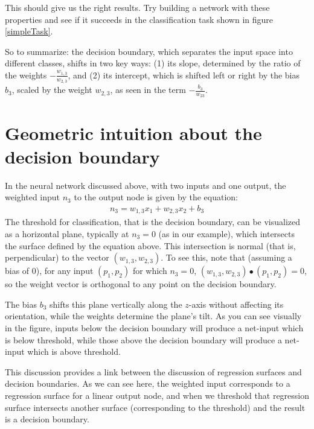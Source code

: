 This should give us the right results. Try building a network with these properties and see if it succeeds in the classification task  shown in figure \ref{simpleTask}.

So to summarize: the decision boundary, which separates the input space into different classes, shifts in two key ways: (1) its slope, determined by the ratio of the weights $-\frac{w_{1,3}}{w_{2,3}}$, and (2) its intercept, which is shifted left or right by the bias $b_3$, scaled by the weight $w_{2,3}$, as seen in the term $-\frac{b_3}{w_{23}}$.

\section{Geometric intuition about the decision boundary}

In the neural network discussed above, with two inputs and one output, the weighted input $n_3$ to the output node is given by the equation:
\begin{eqnarray*}
n_3 = w_{1,3} x_1 + w_{2,3} x_2 + b_3
\end{eqnarray*}
The threshold for classification, that is the decision boundary, can be visualized as a horizontal plane, typically at $n_3 = 0$ (as in our example), which intersects the surface defined by the equation above. This intersection is normal (that is, perpendicular) to the vector $(w_{1,3}, w_{2,3})$. To see this, note that (assuming a bias of 0), for any input $(p_1,p_2)$ for which $n_3 = 0$, $(w_{1,3}, w_{2,3}) \bullet  (p_1,p_2) = 0$, so the weight vector is orthogonal to any point on the decision boundary.

The bias $b_3$ shifts this plane vertically along the $z$-axis without affecting its orientation, while the weights determine the plane’s tilt. As you can see visually in the figure, inputs below the decision boundary will produce a net-input which is below threshold, while those above the decision boundary will produce a net-input which is above threshold.

This discussion provides a link between the discussion of regression surfaces and decision boundaries. As we can see here, the weighted input corresponds to a regression surface for a linear output node, and when we threshold that regression surface intersects another surface (corresponding to the threshold) and the result is a decision boundary.

